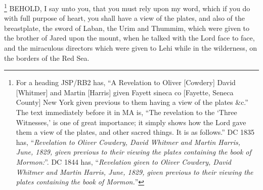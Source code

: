 			\footnote{%
				For a heading JSP/RB2 has, ``A Revelation to Oliver [Cowdery] David [Whitmer] and Martin [Harris] given Fayett sineca co [Fayette, Seneca County] New York given previous to them having a view of the plates \&c.'' The text immediately before it in MA is, ``The revelation to the `Three Witnesses,' is one of great importance; it simply shows how the Lord gave them a view of the plates, and other sacred things. It is as follows.'' DC 1835 has, ``\textit{Revelation to Oliver Cowdery, David Whitmer and Martin Harris, June, 1829, given previous to their viewing the plates containing the book of Mormon:}''. DC 1844 has, ``\textit{Revelation given to Oliver Cowdery, David Whitmer and Martin Harris, June, 1829, given previous to their viewing the plates containing the book of Mormon.}''
				}%
		BEHOLD, I say unto you, that you must rely upon my word, which if you do with full purpose of heart, you shall have a view of the plates, and also of the breastplate, the sword of Laban, the Urim and Thummim, which were given to the brother of Jared upon the mount, when he talked with the Lord face to face, and the miraculous directors which were given to Lehi while in the wilderness, on the borders of the Red Sea.%
